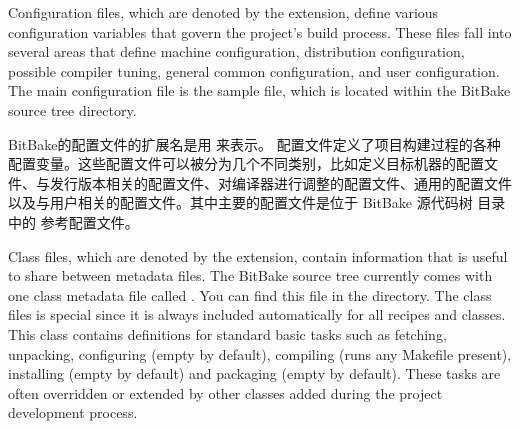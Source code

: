 
\label{section:Configuration Files}

Configuration files, which are denoted by the  extension, define various configuration variables that govern the project's build process. These files fall into several areas that define machine configuration, distribution configuration, possible compiler tuning, general common configuration, and user configuration. The main configuration file is the sample  file, which is located within the BitBake source tree  directory.

BitBake的配置文件的扩展名是用  来表示。 配置文件定义了项目构建过程的各种配置变量。这些配置文件可以被分为几个不同类别，比如定义目标机器的配置文件、与发行版本相关的配置文件、对编译器进行调整的配置文件、通用的配置文件以及与用户相关的配置文件。其中主要的配置文件是位于 BitBake 源代码树  目录中的  参考配置文件。

\label{section:Classes}

Class files, which are denoted by the  extension, contain information that is useful to share between metadata files. The BitBake source tree currently comes with one class metadata file called . You can find this file in the  directory. The  class files is special since it is always included automatically for all recipes and classes. This class contains definitions for standard basic tasks such as fetching, unpacking, configuring (empty by default), compiling (runs any Makefile present), installing (empty by default) and packaging (empty by default). These tasks are often overridden or extended by other classes added during the project development process.

